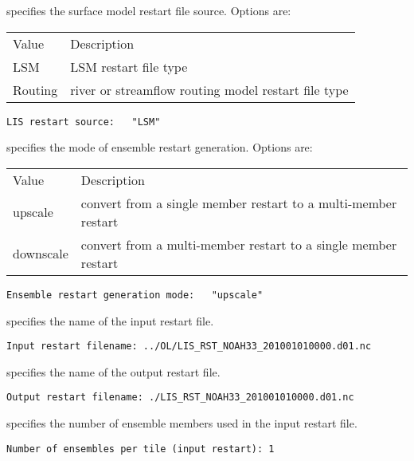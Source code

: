  
 specifies the surface model restart file source. Options are:

 \begin{tabular}{ll}
 Value     & Description                   \\
 LSM       & LSM restart file type         \\ 
 Routing   & river or streamflow routing 
             model restart file type       \\
 \end{tabular}
 

 \begin{Verbatim}[frame=single]
LIS restart source:   "LSM"
 \end{Verbatim}

 
 specifies the mode of ensemble restart generation. Options are:

 \begin{tabular}{ll}
 Value     & Description                          \\
 upscale   & convert from a single member restart
             to a multi-member restart            \\
 downscale & convert from a multi-member restart
             to a single member restart           \\
 \end{tabular}
 

 \begin{Verbatim}[frame=single]
Ensemble restart generation mode:   "upscale"
 \end{Verbatim}

 
 specifies the name of the input restart file. 
 

 \begin{Verbatim}[frame=single]
Input restart filename: ../OL/LIS_RST_NOAH33_201001010000.d01.nc
 \end{Verbatim}

 
 specifies the name of the output restart file. 
 

 \begin{Verbatim}[frame=single]
Output restart filename: ./LIS_RST_NOAH33_201001010000.d01.nc
 \end{Verbatim}

 
 specifies the number of ensemble members used in the input restart
 file. 
 

 \begin{Verbatim}[frame=single]
Number of ensembles per tile (input restart): 1
 \end{Verbatim}

